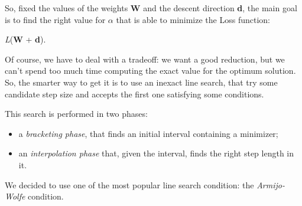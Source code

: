 			So, fixed the values of the weights \textbf{W} and the descent direction \textbf{d}, the main goal is to find the right value for $\alpha$ that is able to minimize the Loss function:

			 \begin{mini}
			   {\alpha}{\textit{L}(\textbf{W} + \alpha\textbf{d}).}{}{}
			 \end{mini}

			Of course, we have to deal with a tradeoff: we want a good reduction, but we can't spend too much time computing the exact value for the optimum solution. So, the smarter way to get it is to use an inexact line search, that try some candidate step size and accepts the first one satisfying some conditions.

			This search is performed in two phases:
			\begin{itemize}
			\item a \textit{bracketing phase}, that finds an initial interval containing a minimizer;
			\item an \textit{interpolation phase} that, given the interval, finds the right step length in it.
			\end{itemize}

			We decided to use one of the most popular line search condition: the \textit{Armijo-Wolfe} condition.

